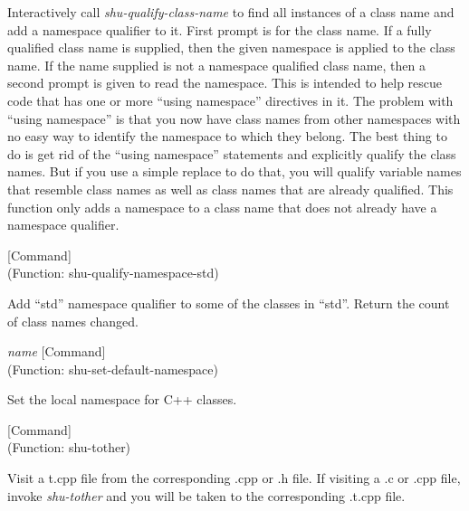 \begin{doc-string}
Interactively call \emph{shu-qualify-class-name} to find all instances of a class name and
add a namespace qualifier to it.  First prompt is for the class name.  If a fully qualified
class name is supplied, then the given namespace is applied to the class name.  If the name
supplied is not a namespace qualified class name, then a second prompt is given to read the
namespace.
This is intended to help rescue code that has one or more ``using namespace''
directives in it.  The problem with ``using namespace'' is that you now have
class names from other namespaces with no easy way to identify the namespace
to which they belong.  The best thing to do is get rid of the ``using
namespace'' statements and explicitly qualify the class names.  But if you
use a simple replace to do that, you will qualify variable names that resemble
class names as well as class names that are already qualified.  This function
only adds a namespace to a class name that does not already have a namespace
qualifier.
\end{doc-string}

\vspace{1em}
\noindent
{}
\usebox{\funcname}
 \hfill [Command]\\%
 (Function: shu-qualify-namespace-std)

\begin{doc-string}
Add ``std'' namespace qualifier to some of the classes in ``std''.  Return the
count of class names changed.
\end{doc-string}

\vspace{1em}
\noindent
{}
\usebox{\funcname}\emph{name}
 \hfill [Command]\\%
 (Function: shu-set-default-namespace)

\begin{doc-string}
Set the local namespace for C++ classes.
\end{doc-string}

\vspace{1em}
\noindent
{}
\usebox{\funcname}
 \hfill [Command]\\%
 (Function: shu-tother)

\begin{doc-string}
Visit a t.cpp file from the corresponding .cpp or .h file.  If visiting a .c or
.cpp file, invoke \emph{shu-tother} and you will be taken to the corresponding .t.cpp
file.
\end{doc-string}

